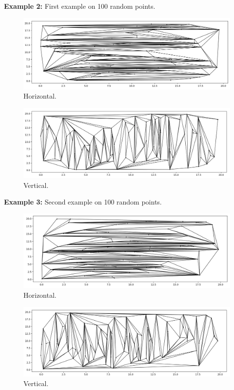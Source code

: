 \documentclass[a4paper,11pt]{article}
\begin{document}
\noindent
\textbf{Example 2:} First example on 100 random points.
\begin{figure}[ht!]
    \centering
    \includegraphics[width=150mm]{prim1_h.png}
    \caption{Horizontal.}
\end{figure}

\begin{figure}[ht!]
    \centering
    \includegraphics[width=150mm]{prim1_v.png}
    \caption{Vertical.}
\end{figure}

\newpage
\noindent
\textbf{Example 3:} Second example on 100 random points.
\begin{figure}[ht!]
    \centering
    \includegraphics[width=150mm]{prim2_h.png}
    \caption{Horizontal.}
\end{figure}

\begin{figure}[ht!]
    \centering
    \includegraphics[width=150mm]{prim2_v.png}
    \caption{Vertical.}
\end{figure}
\end{document}
